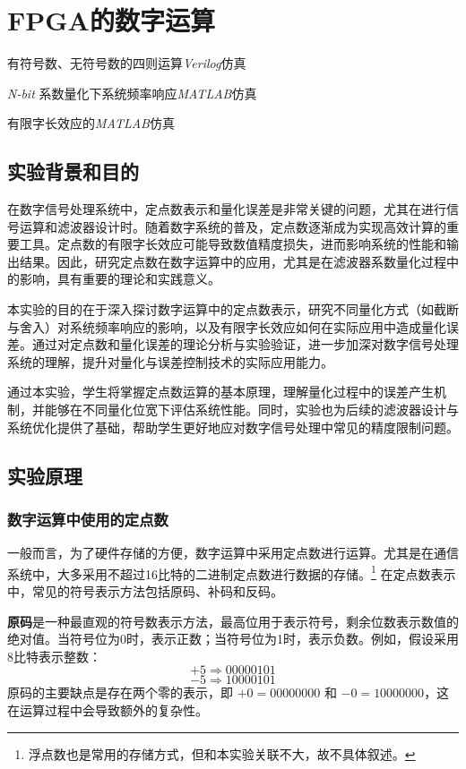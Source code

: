 \chapter{FPGA的数字运算}
\begin{introduction}
  \item 有符号数、无符号数的四则运算\textit{Verilog}仿真
  \item \textit{N-bit} 系数量化下系统频率响应\textit{MATLAB}仿真
  \item 有限字长效应的\textit{MATLAB}仿真
\end{introduction}
\section{实验背景和目的}

在数字信号处理系统中，定点数表示和量化误差是非常关键的问题，尤其在进行信号运算和滤波器设计时。随着数字系统的普及，定点数逐渐成为实现高效计算的重要工具。定点数的有限字长效应可能导致数值精度损失，进而影响系统的性能和输出结果。因此，研究定点数在数字运算中的应用，尤其是在滤波器系数量化过程中的影响，具有重要的理论和实践意义。

本实验的目的在于深入探讨数字运算中的定点数表示，研究不同量化方式（如截断与舍入）对系统频率响应的影响，以及有限字长效应如何在实际应用中造成量化误差。通过对定点数和量化误差的理论分析与实验验证，进一步加深对数字信号处理系统的理解，提升对量化与误差控制技术的实际应用能力。

通过本实验，学生将掌握定点数运算的基本原理，理解量化过程中的误差产生机制，并能够在不同量化位宽下评估系统性能。同时，实验也为后续的滤波器设计与系统优化提供了基础，帮助学生更好地应对数字信号处理中常见的精度限制问题。
\section{实验原理}
\subsection{数字运算中使用的定点数}
一般而言，为了硬件存储的方便，数字运算中采用定点数进行运算。尤其是在通信系统中，大多采用不超过16比特的二进制定点数进行数据的存储。\footnote{浮点数也是常用的存储方式，但和本实验关联不大，故不具体叙述。}
在定点数表示中，常见的符号表示方法包括原码、补码和反码。

\textbf{原码}是一种最直观的符号数表示方法，最高位用于表示符号，剩余位数表示数值的绝对值。当符号位为0时，表示正数；当符号位为1时，表示负数。例如，假设采用8比特表示整数：
\[
+5 \Rightarrow 00000101
\]
\[
-5 \Rightarrow 10000101
\]
原码的主要缺点是存在两个零的表示，即 \(+0 = 00000000\) 和 \(-0 = 10000000\)，这在运算过程中会导致额外的复杂性。


